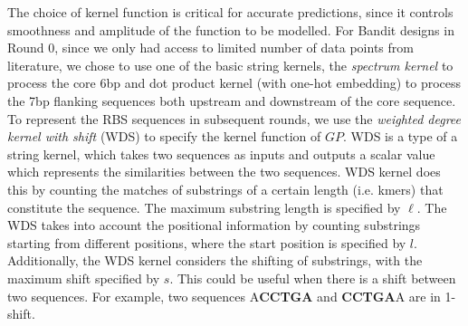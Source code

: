 The choice of kernel function is critical for accurate predictions, since it controls smoothness and amplitude of the function to be modelled.
For Bandit designs in Round 0, since we only had access to limited number of data points from literature, we chose to use one of the basic string kernels, the \textit{spectrum kernel} \cite{leslie2001spectrum} to process the core 6bp and dot product kernel \cite{Rasmussen2004} (with one-hot embedding) to process the 7bp flanking sequences both upstream and downstream of the core sequence.
To represent the RBS sequences in subsequent rounds, we use the \textit{weighted degree kernel with shift} (WDS) \cite{ratsch_rase_2005_wds,Ben-Hur2008} to specify the kernel function of $GP$.  
WDS is a type of a string kernel, which takes two sequences as inputs and outputs a scalar value which represents the similarities between the two sequences.  
WDS kernel does this by counting the matches of substrings of a certain length (i.e. kmers) that constitute the sequence.
The maximum substring length is specified by $\ell$. 
The WDS takes into account the positional information by counting substrings starting from different positions, where the start position is specified by $l$.
Additionally, the WDS kernel considers the shifting of substrings, with the maximum shift specified by $s$.
This could be useful when there is a shift between two sequences.
For example, two sequences A\textbf{CCTGA} and \textbf{CCTGA}A are in 1-shift. 

